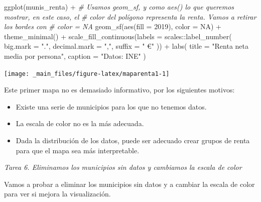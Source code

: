 \documentclass[
]{book}
\newenvironment{Shaded}{\begin{snugshade}}{\end{snugshade}}
\newcommand{\AttributeTok}[1]{\textcolor[rgb]{0.77,0.63,0.00}{#1}}
\newcommand{\CommentTok}[1]{\textcolor[rgb]{0.56,0.35,0.01}{\textit{#1}}}
\newcommand{\ConstantTok}[1]{\textcolor[rgb]{0.00,0.00,0.00}{#1}}
\newcommand{\FunctionTok}[1]{\textcolor[rgb]{0.00,0.00,0.00}{#1}}
\newcommand{\NormalTok}[1]{#1}
\newcommand{\SpecialCharTok}[1]{\textcolor[rgb]{0.00,0.00,0.00}{#1}}
\newcommand{\StringTok}[1]{\textcolor[rgb]{0.31,0.60,0.02}{#1}}
\begin{document}
\begin{Shaded}
\begin{Highlighting}[]

\FunctionTok{ggplot}\NormalTok{(munis\_renta) }\SpecialCharTok{+}
  \CommentTok{\# Usamos geom\_sf, y como aes() lo que queremos mostrar, en este caso, el}
  \CommentTok{\# color del polígono representa la renta. Vamos a retirar los bordes con}
  \CommentTok{\# color = NA}
  \FunctionTok{geom\_sf}\NormalTok{(}\FunctionTok{aes}\NormalTok{(}\AttributeTok{fill =} \StringTok{\textasciigrave{}}\AttributeTok{2019}\StringTok{\textasciigrave{}}\NormalTok{), }\AttributeTok{color =} \ConstantTok{NA}\NormalTok{) }\SpecialCharTok{+}
  \FunctionTok{theme\_minimal}\NormalTok{() }\SpecialCharTok{+}
  \FunctionTok{scale\_fill\_continuous}\NormalTok{(}\AttributeTok{labels =}\NormalTok{ scales}\SpecialCharTok{::}\FunctionTok{label\_number}\NormalTok{(}
    \AttributeTok{big.mark =} \StringTok{"."}\NormalTok{,}
    \AttributeTok{decimal.mark =} \StringTok{","}\NormalTok{,}
    \AttributeTok{suffix =} \StringTok{" €"}
\NormalTok{  )) }\SpecialCharTok{+}
  \FunctionTok{labs}\NormalTok{(}
    \AttributeTok{title =} \StringTok{"Renta neta media por persona"}\NormalTok{,}
    \AttributeTok{caption =} \StringTok{"Datos: INE"}
\NormalTok{  )}
\end{Highlighting}
\end{Shaded}

\begin{center}\texttt{[image: \_main\_files/figure-latex/maparenta1-1]} \end{center}

Este primer mapa no es demasiado informativo, por los siguientes motivos:

\begin{itemize}
\item
  Existe una serie de municipios para los que no tenemos datos.
\item
  La escala de color no es la más adecuada.
\item
  Dada la distribución de los datos, puede ser adecuado crear grupos de renta
  para que el mapa sea más interpretable.
\end{itemize}

\emph{Tarea 6. Eliminamos los municipios sin datos y cambiamos la escala de color}

Vamos a probar a eliminar los municipios sin datos y a cambiar la escala de
color para ver si mejora la visualización.
\end{document}
